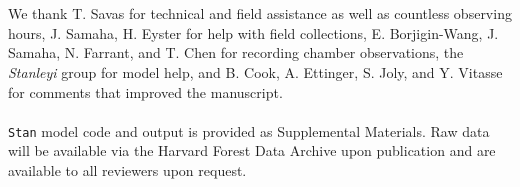 \documentclass[11pt]{article}
\begin{document}


\vspace{2ex}\\
\vspace{1ex}\\
We thank T. Savas for technical and field assistance as well as countless observing hours, J. Samaha, H. Eyster for help with field collections, E. Borjigin-Wang, J. Samaha, N. Farrant, and T. Chen for recording chamber observations, the \emph{Stanleyi} group for model help, and B. Cook, A. Ettinger, S. Joly, and Y. Vitasse for comments that improved the manuscript. 
\vspace{2ex}\\
\vspace{1ex}\\
\texttt{Stan} model code and output is provided as Supplemental Materials. Raw data will be available via the Harvard Forest Data Archive upon publication and are available to all reviewers upon request. 
\newpage
\end{document}
